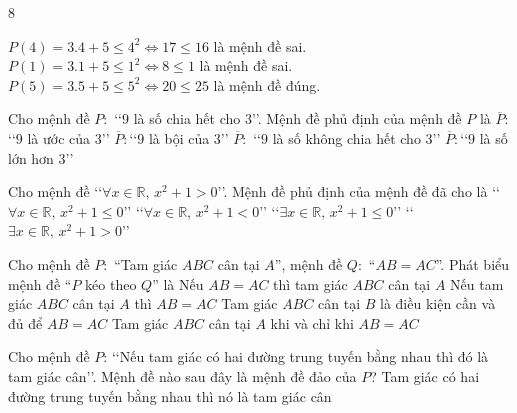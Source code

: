 \begin{indapan}{8}
\begin{ex}
{		$P(4) =3.4+5\leqslant 4^2 \Leftrightarrow 17\leqslant 16$ là mệnh đề sai.\\
		$P(1)=3.1+5\leqslant 1^2 \Leftrightarrow 8\leqslant 1$ là mệnh đề sai.\\
		$P(5) =3.5+5\leqslant 5^2 \Leftrightarrow 20\leqslant 25$ là mệnh đề đúng.}
\end{ex}
\begin{ex}%
	Cho mệnh đề $P\colon$ \lq\lq   $9$ là số chia hết cho $3$\rq\rq. Mệnh đề phủ định của mệnh đề $P$ là
	\choice
	{$\overline{P}\colon$\lq\lq   $9$ là ước của $3$\rq\rq}
	{$\overline{P}\colon$\lq\lq   $9$ là bội của $3$\rq\rq}
	{\True $\overline{P}\colon$ \lq\lq   $9$ là số không chia hết cho $3$\rq\rq}
	{$\overline{P}\colon$\lq\lq   $9$ là số lớn hơn $3$\rq\rq}
\end{ex}
\begin{ex}%
	Cho mệnh đề \lq\lq $\forall x\in \mathbb{R},\, x^2+1>0$\rq \rq. Mệnh đề phủ định của mệnh đề đã cho là
	\choice
	{\lq\lq $\forall x\in \mathbb{R},\, x^2+1\leq 0$\rq \rq}
	{\lq\lq $\forall x\in \mathbb{R},\, x^2+1<0$\rq \rq}
	{\True \lq\lq $\exists x\in \mathbb{R},\, x^2+1\leq 0$\rq \rq}
	{\lq\lq $\exists x\in \mathbb{R},\, x^2+1>0$\rq \rq}
\end{ex}
\begin{ex}%
	Cho mệnh đề $P\colon$ ``Tam giác $ABC$ cân tại $A$'', mệnh đề $Q\colon$ ``$AB=AC$''. Phát biểu mệnh đề ``$P$ kéo theo $Q$'' là
	\choice
	{Nếu $AB=AC$ thì tam giác $ABC$ cân tại $A$}
	{\True Nếu tam giác $ABC$ cân tại $A$ thì $AB=AC$}
	{Tam giác $ABC$ cân tại $B$ là điều kiện cần và đủ để $AB=AC$}
	{Tam giác $ABC$ cân tại $A$ khi và chỉ khi $AB=AC$}
\end{ex}
\begin{ex}%
	Cho mệnh đề $P$: \lq\lq  Nếu tam giác có hai đường trung tuyến bằng nhau thì đó là tam giác cân\rq\rq. Mệnh đề nào sau đây là mệnh đề đảo của $P$?
	\choice
	{Tam giác có hai đường trung tuyến bằng nhau thì nó là tam giác cân}

\end{ex}
\end{indapan}
